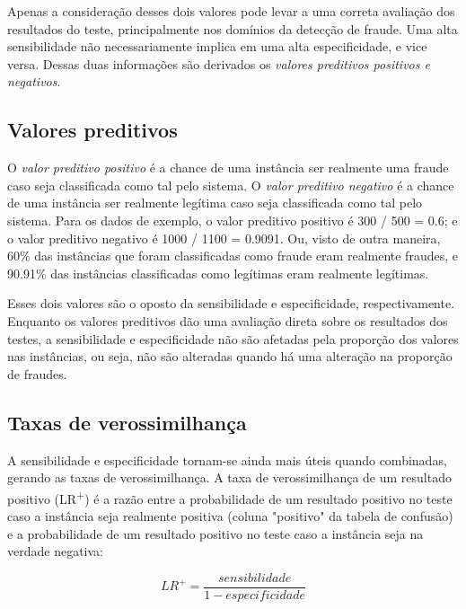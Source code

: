 Apenas a consideração desses dois valores pode levar a uma correta avaliação dos resultados do teste, principalmente nos domínios da detecção de fraude. Uma alta sensibilidade não necessariamente implica em uma alta especificidade, e vice versa. Dessas duas informações são derivados os \emph{valores preditivos positivos e negativos}.

\subsection{Valores preditivos}

O \emph{valor preditivo positivo} é a chance de uma instância ser realmente uma fraude caso seja classificada como tal pelo sistema. O \emph{valor preditivo negativo} é a chance de uma instância ser realmente legítima caso seja classificada como tal pelo sistema. Para os dados de exemplo, o valor preditivo positivo é 300 / 500 = 0.6; e o valor preditivo negativo é 1000 / 1100 = 0.9091. Ou, visto de outra maneira, 60\% das instâncias que foram classificadas como fraude eram realmente fraudes, e 90.91\% das instâncias classificadas como legítimas eram realmente legítimas.

Esses dois valores são o oposto da sensibilidade e especificidade, respectivamente. Enquanto os valores preditivos dão uma avaliação direta sobre os resultados dos testes, a sensibilidade e especificidade não são afetadas pela proporção dos valores nas instâncias, ou seja, não são alteradas quando há uma alteração na proporção de fraudes.

\subsection{Taxas de verossimilhança}

A sensibilidade e especificidade tornam-se ainda mais úteis quando combinadas, gerando as taxas de verossimilhança. A taxa de verossimilhança de um resultado positivo (LR\textsuperscript{+}) é a razão entre a probabilidade de um resultado positivo no teste caso a instância seja realmente positiva (coluna "positivo" da tabela de confusão) e a probabilidade de um resultado positivo no teste caso a instância seja na verdade negativa:

\vspace{2mm}
\begin{equation}
    LR^{+}=\frac{sensibilidade}{1 - especificidade}
\end{equation}
\vspace{2mm}

